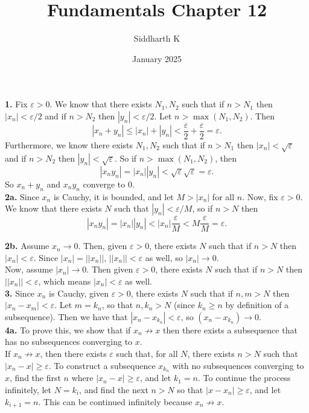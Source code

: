 \documentclass{article}
\title{Fundamentals Chapter 12}
\author{Siddharth K}
\date{January 2025}
\newcommand{\eps}{\varepsilon}
\begin{document}
\maketitle

\textbf{1.} Fix $\eps > 0$. We know that there exists $N_1, N_2$ such that if $n > N_1$ then $|x_n| < \eps/2$ and if $n > N_2$ then $|y_n| < \eps/2$. Let $n > \max(N_1, N_2)$. Then
$$|x_n + y_n| \le |x_n| + |y_n| < \frac{\eps}{2} + \frac{\eps}{2} = \eps.$$
Furthermore, we know there exists $N_1, N_2$ such that if $n > N_1$ then $|x_n| < \sqrt{\eps}$ and if $n > N_2$ then $|y_n| < \sqrt{\eps}$. So if $n > \max(N_1, N_2)$, then
$$|x_ny_n| = |x_n||y_n| < \sqrt{\eps}\sqrt{\eps} = \eps.$$
So $x_n + y_n$ and $x_ny_n$ converge to $0$. \\

\textbf{2a.} Since $x_n$ is Cauchy, it is bounded, and let $M > |x_n|$ for all $n$. Now, fix $\eps > 0$. We know that there exists $N$ such that $|y_n| < \eps/M$, so if $n > N$ then
$$|x_ny_n| = |x_n||y_n| < |x_n|\frac{\eps}{M} < M\frac{\eps}{M} = \eps.$$

\textbf{2b.} Assume $x_n \to 0$. Then, given $\eps > 0$, there exists $N$ such that if $n > N$ then $|x_n| < \eps$. Since $|x_n| = ||x_n||$, $||x_n|| < \eps$ as well, so $|x_n| \to 0$. \\

Now, assume $|x_n| \to 0$. Then given $\eps > 0$, there exists $N$ such that if $n > N$ then $||x_n|| < \eps$, which means $|x_n| < \eps$ as well. \\

\textbf{3.} Since $x_n$ is Cauchy, given $\eps > 0$, there exists $N$ such that if $n, m > N$ then $|x_n - x_m| < \eps$. Let $m = k_n$, so that $n, k_n > N$ (since $k_n \ge n$ by definition of a subsequence). Then we have that $|x_n - x_{k_n}| < \eps$, so $(x_n - x_{k_n}) \to 0$. \\

\textbf{4a.} To prove this, we show that if $x_n \not \to x$ then there exists a subsequence that has no subsequences converging to $x$. \\

If $x_n \not \to x$, then there exists $\eps$ such that, for all $N$, there exists $n > N$ such that $|x_n - x| \ge \eps$. To construct a subsequence $x_{k_n}$ with no subsequences converging to $x$, find the first $n$ where $|x_n - x| \ge \eps$, and let $k_1 = n$. To continue the process infinitely, let $N = k_i$, and find the next $n > N$ so that $|x - x_n| \ge \eps$, and let $k_{i + 1} = n$. This can be continued infinitely because $x_n \not \to x$. \\
\end{document}
